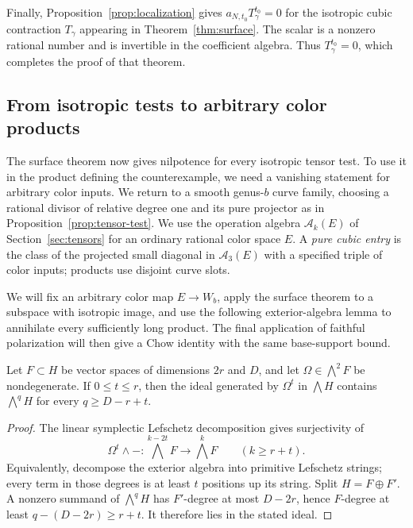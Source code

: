 Finally, Proposition~\ref{prop:localization} gives
\(a_{N,t_0}T_\gamma^{t_0}=0\) for the isotropic cubic contraction
\(T_\gamma\) appearing in Theorem~\ref{thm:surface}.
The scalar is a nonzero rational number and is invertible in the
coefficient algebra. Thus \(T_\gamma^{t_0}=0\), which completes
the proof of that theorem.

\subsection{From isotropic tests to arbitrary color products}

The surface theorem now gives nilpotence for every isotropic tensor
test. To use it in the product defining the
counterexample, we need a vanishing statement for arbitrary color
inputs. We return to a smooth genus-$b$ curve family, choosing a rational
divisor of relative degree one and its pure projector as in
Proposition~\ref{prop:tensor-test}. We use the operation algebra $\mathcal A_k(E)$ of
Section~\ref{sec:tensors} for an ordinary rational color space $E$.
A \emph{pure cubic entry} is the class of the projected small diagonal
in $\mathcal A_3(E)$ with a specified triple of color inputs; products
use disjoint curve slots.

We will fix an arbitrary color map $E\to W_b$, apply the surface theorem
to a subspace with isotropic image, and use the following exterior-algebra
lemma to annihilate every sufficiently long product. The final
application of faithful polarization will then give a Chow identity
with the same base-support bound.

\begin{lemma}
\label{lem:exterior-ideal}
Let \(F\subset H\) be vector spaces of dimensions \(2r\) and \(D\), and
let \(\Omega\in\bigwedge^2F\) be nondegenerate.  If \(0\le t\le r\), then
the ideal generated by \(\Omega^t\) in \(\bigwedge H\) contains
\(\bigwedge^qH\) for every \(q\ge D-r+t\).
\end{lemma}

\begin{proof}
The linear symplectic Lefschetz decomposition gives surjectivity of
\[
 \Omega^t\wedge-:
 \bigwedge^{k-2t}F\longrightarrow\bigwedge^kF
 \qquad(k\ge r+t).
\]
Equivalently, decompose the exterior algebra into primitive Lefschetz
strings; every term in those degrees is at least \(t\) positions up its
string.  Split \(H=F\oplus F'\).  A nonzero summand of
\(\bigwedge^qH\) has \(F'\)-degree at most \(D-2r\), hence \(F\)-degree
at least \(q-(D-2r)\ge r+t\).  It therefore lies in the stated ideal.
\end{proof}

